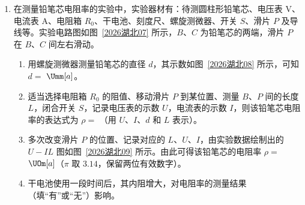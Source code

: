 \documentclass[\gkver]{gaokaozhenti}
\begin{document}
\begin{enumerate}
\item
在测量铅笔芯电阻率的实验中，实验器材有：待测圆柱形铅笔芯、电压表 $ \mathrm{V} $、电流表 $ \mathrm{A} $、电阻箱 $ R_{0} $、干电池、刻度尺、螺旋测微器、开关 $ S $、滑片 $ P $ 及导线等。实验电路图如图~\ref{2026湖北07} 所示，$ B $、$ C $ 为铅笔芯的两端，滑片 $ P $ 在 $ B $、$ C $ 间左右滑动。
\twopicture[labelA=2026湖北07, labelB=2026湖北08, wA=4.81cm, hB=3.17cm]
{}{}
\begin{enumerate}
\item
用螺旋测微器测量铅笔芯的直径 $d$，其示数如图~\ref{2026湖北08} 所示，可知 $d=$  $\Umm[a]$。
\item
适当选择电阻箱 $ R_{0} $ 的阻值、移动滑片 $ P $ 到某位置、测量 $ B $、$ P $ 间的长度 $ L $，闭合开关 $ S $，记录电压表的示数 $ U $，电流表的示数 $ I $，则该铅笔芯电阻率的表达式为 $ \rho = $ （用 $ U $、$ I $、$ d $ 和 $ L $ 表示）。
\item
多次改变滑片 $ P $ 的位置、记录对应的 $ L $、$ U $、$ I $，由实验数据绘制出的 $ U-IL $ 图如图~\ref{2026湖北09} 所示。由此可得该铅笔芯的电阻率 $ \rho = $  $ \UOm[a] $（$ \pi $ 取 $ 3.14 $，保留两位有效数字）。
\onepicture[num=c, showlabel=false, label=2026湖北09, w=8.27cm]{}
\item
干电池使用一段时间后，其内阻增大，对电阻率的测量结果（填“有”或“无”）影响。	
\end{enumerate}



\end{enumerate}
\end{document}
